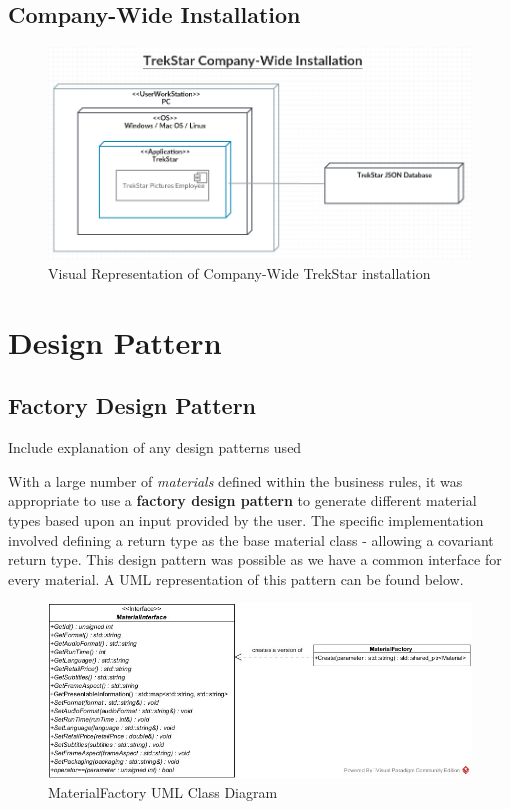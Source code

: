 \documentclass[
  english,
  a4paper,
,tablecaptionabove
]{scrartcl}
\begin{document}
\hypertarget{company-wide-installation}{%
\subsection{Company-Wide Installation}\label{company-wide-installation}}

\begin{figure}
\centering
\includegraphics{images/deployment-diagrams/trekstar-company-installation.png}
\caption{Visual Representation of Company-Wide TrekStar installation}
\end{figure}

\newpage

\hypertarget{design-pattern}{%
\section{Design Pattern}\label{design-pattern}}

\hypertarget{factory-design-pattern}{%
\subsection{Factory Design Pattern}\label{factory-design-pattern}}

Include explanation of any design patterns used

With a large number of \emph{materials} defined within the business
rules, it was appropriate to use a \textbf{factory design pattern} to
generate different material types based upon an input provided by the
user. The specific implementation involved defining a return type as the
base material class - allowing a covariant return type. This design
pattern was possible as we have a common interface for every material. A
UML representation of this pattern can be found below.

\begin{figure}
\centering
\includegraphics{images/class-diagrams/material-factory.jpg}
\caption{MaterialFactory UML Class Diagram}
\end{figure}
\end{document}
